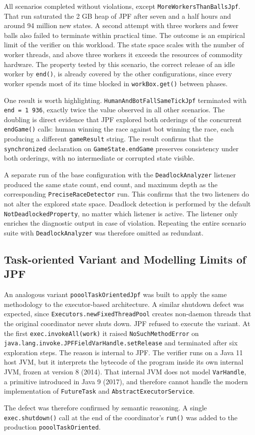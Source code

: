 \documentclass{scrartcl}
\begin{document}
All scenarios completed without violations, except \texttt{MoreWorkersThanBallsJpf}. That run saturated the 2 GB heap of JPF after seven and a half hours and around 94 million new states. A second attempt with three workers and fewer balls also failed to terminate within practical time. The outcome is an empirical limit of the verifier on this workload. The state space scales with the number of worker threads, and above three workers it exceeds the resources of commodity hardware. The property tested by this scenario, the correct release of an idle worker by \texttt{end()}, is already covered by the other configurations, since every worker spends most of its time blocked in \texttt{workBox.get()} between phases.

One result is worth highlighting. \texttt{HumanAndBotFallSameTickJpf} terminated with \texttt{end = 1\,936}, exactly twice the value observed in all other scenarios. The doubling is direct evidence that JPF explored both orderings of the concurrent \texttt{endGame()} calls: human winning the race against bot winning the race, each producing a different \texttt{gameResult} string. The result confirms that the \texttt{synchronized} declaration on \texttt{GameState.endGame} preserves consistency under both orderings, with no intermediate or corrupted state visible.

A separate run of the base configuration with the \texttt{DeadlockAnalyzer} listener produced the same state count, end count, and maximum depth as the corresponding \texttt{PreciseRaceDetector} run. This confirms that the two listeners do not alter the explored state space. Deadlock detection is performed by the default \texttt{NotDeadlockedProperty}, no matter which listener is active. The listener only enriches the diagnostic output in case of violation. Repeating the entire scenario suite with \texttt{DeadlockAnalyzer} was therefore omitted as redundant.

\subsection{Task-oriented Variant and Modelling Limits of JPF}

An analogous variant \texttt{pooolTaskOrientedJpf} was built to apply the same methodology to the executor-based architecture. A similar shutdown defect was expected, since \texttt{Executors.newFixedThreadPool} creates non-daemon threads that the original coordinator never shuts down. JPF refused to execute the variant. At the first \texttt{exec.invokeAll(work)} it raised \texttt{NoSuchMethodError} on \texttt{java.lang.invoke.JPFFieldVarHandle.setRelease} and terminated after six exploration steps. The reason is internal to JPF. The verifier runs on a Java 11 host JVM, but it interprets the bytecode of the program inside its own internal JVM, frozen at version 8 (2014). That internal JVM does not model \texttt{VarHandle}, a primitive introduced in Java 9 (2017), and therefore cannot handle the modern implementation of \texttt{FutureTask} and \texttt{AbstractExecutorService}.

The defect was therefore confirmed by semantic reasoning. A single \texttt{exec.shutdown()} call at the end of the coordinator's \texttt{run()} was added to the production \texttt{pooolTaskOriented}.
\end{document}

